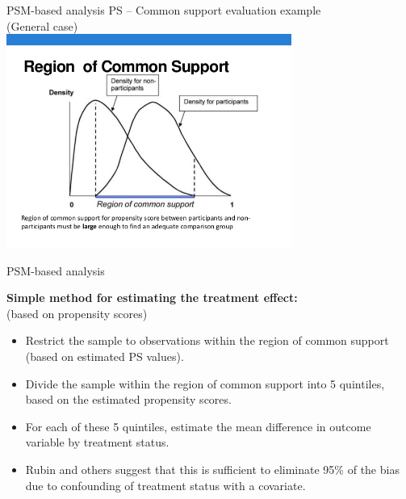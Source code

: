 \documentclass{beamer}
\begin{document}
\begin{frame}{PSM-based analysis}
    \centering
    PS -- Common support evaluation example \\(General case)\\
\includegraphics[trim = 0cm 0cm 0cm 0cm, clip, width=0.7\textwidth]{./IMG/PSM_comm_supp_2.jpg}    
\end{frame}
\begin{frame}{PSM-based analysis}

\textbf{Simple method for estimating the treatment effect:}\\
(based on propensity scores)\\ \medskip
\begin{itemize}
    \item Restrict the sample to observations within the region of common support (based on estimated PS values).
    \item Divide the sample within the region of common support into 5 quintiles, based on the estimated propensity scores.
    \item For each of these 5 quintiles, estimate the mean difference in outcome variable by treatment status. 
    \item Rubin and others suggest that this is sufficient to eliminate 95\% of the bias due to confounding of treatment status with a covariate.
\end{itemize}
\end{frame}
\end{document}
